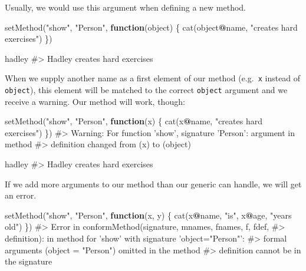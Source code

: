 \documentclass[
]{krantz}
\makeatletter
\newenvironment{Shaded}{\begin{snugshade}}{\end{snugshade}}
\newcommand{\CommentTok}[1]{\textcolor[rgb]{0.56,0.35,0.01}{\textit{#1}}}
\newcommand{\ControlFlowTok}[1]{\textcolor[rgb]{0.13,0.29,0.53}{\textbf{#1}}}
\newcommand{\KeywordTok}[1]{\textcolor[rgb]{0.13,0.29,0.53}{\textbf{#1}}}
\newcommand{\NormalTok}[1]{#1}
\newcommand{\OperatorTok}[1]{\textcolor[rgb]{0.81,0.36,0.00}{\textbf{#1}}}
\newcommand{\StringTok}[1]{\textcolor[rgb]{0.31,0.60,0.02}{#1}}
\newenvironment{kframe}{%
\medskip{}
\setlength{\fboxsep}{.8em}
 \def\at@end@of@kframe{}%
 \ifinner\ifhmode%
  \def\at@end@of@kframe{\end{minipage}}%
  \begin{minipage}{\columnwidth}%
 \fi\fi%
 \def\FrameCommand##1{\hskip\@totalleftmargin \hskip-\fboxsep
 \colorbox{shadecolor}{##1}\hskip-\fboxsep
     \hskip-\linewidth \hskip-\@totalleftmargin \hskip\columnwidth}%
 \MakeFramed {\advance\hsize-\width
   \@totalleftmargin\z@ \linewidth\hsize
   \@setminipage}}%
 {\par\unskip\endMakeFramed%
 \at@end@of@kframe}
\renewenvironment{Shaded}{\begin{kframe}}{\end{kframe}}
\renewcommand{\KeywordTok} [1]{\textcolor[rgb]{0.00,0.44,0.13}{{#1}}}
\renewcommand{\StringTok}  [1]{\textcolor[rgb]{0.25,0.44,0.63}{{#1}}}
\renewcommand{\CommentTok} [1]{\textcolor[rgb]{0.38,0.63,0.69}{{#1}}}
\renewcommand{\NormalTok}  [1]{{#1}}
\makeatother
\begin{document}
Usually, we would use this argument when defining a new method.

\begin{Shaded}
\begin{Highlighting}[]
\KeywordTok{setMethod}\NormalTok{(}\StringTok{"show"}\NormalTok{, }\StringTok{"Person"}\NormalTok{, }\ControlFlowTok{function}\NormalTok{(object) \{}
  \KeywordTok{cat}\NormalTok{(object}\OperatorTok{@}\NormalTok{name, }\StringTok{"creates hard exercises"}\NormalTok{)}
\NormalTok{\})}

\NormalTok{hadley}
\CommentTok{#> Hadley creates hard exercises}
\end{Highlighting}
\end{Shaded}

When we supply another name as a first element of our method (e.g.~\texttt{x} instead of \texttt{object}), this element will be matched to the correct \texttt{object} argument and we receive a warning. Our method will work, though:

\begin{Shaded}
\begin{Highlighting}[]
\KeywordTok{setMethod}\NormalTok{(}\StringTok{"show"}\NormalTok{, }\StringTok{"Person"}\NormalTok{, }\ControlFlowTok{function}\NormalTok{(x) \{}
  \KeywordTok{cat}\NormalTok{(x}\OperatorTok{@}\NormalTok{name, }\StringTok{"creates hard exercises"}\NormalTok{)}
\NormalTok{\})}
\CommentTok{#> Warning: For function 'show', signature 'Person': argument in method}
\CommentTok{#> definition changed from (x) to (object)}

\NormalTok{hadley}
\CommentTok{#> Hadley creates hard exercises}
\end{Highlighting}
\end{Shaded}

If we add more arguments to our method than our generic can handle, we will get an error.

\begin{Shaded}
\begin{Highlighting}[]
\KeywordTok{setMethod}\NormalTok{(}\StringTok{"show"}\NormalTok{, }\StringTok{"Person"}\NormalTok{, }\ControlFlowTok{function}\NormalTok{(x, y) \{}
  \KeywordTok{cat}\NormalTok{(x}\OperatorTok{@}\NormalTok{name, }\StringTok{"is"}\NormalTok{, x}\OperatorTok{@}\NormalTok{age, }\StringTok{"years old"}\NormalTok{)}
\NormalTok{\})}
\CommentTok{#> Error in conformMethod(signature, mnames, fnames, f, fdef,}
\CommentTok{#> definition): in method for 'show' with signature 'object="Person"':}
\CommentTok{#> formal arguments (object = "Person") omitted in the method}
\CommentTok{#> definition cannot be in the signature}
\end{Highlighting}
\end{Shaded}
\end{document}
